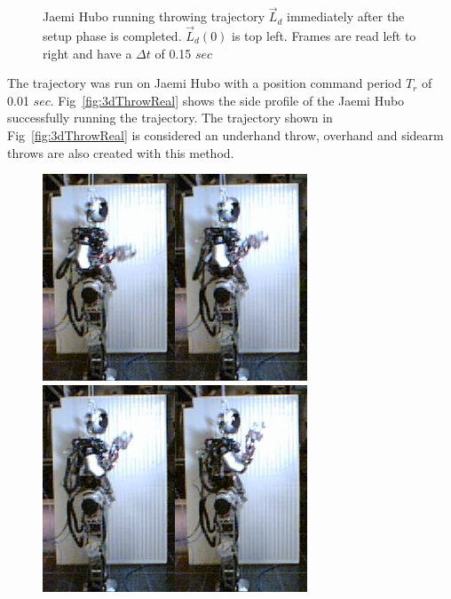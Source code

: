 \begin{figure}[thpb]
  \caption{Jaemi Hubo running throwing trajectory $\vec{L}_d$ immediately after the setup phase is completed.  $\vec{L}_d(0)$ is top left.  Frames are read left to right and have a $\Delta t$ of 0.15 $sec$}
  \label{fig:fThrow}
\end{figure}



The trajectory was run on Jaemi Hubo with a position command period $T_r$ of 0.01 $sec$.  Fig~\ref{fig:3dThrowReal} shows the side profile of the Jaemi Hubo successfully running the trajectory.  The trajectory shown in Fig~\ref{fig:3dThrowReal} is considered an underhand throw, overhand and sidearm throws are also created with this method.

\begin{figure}[thpb]
  \centering
\includegraphics[width=0.25\columnwidth]{./pictures/slowMotion/1.png}\includegraphics[width=0.25\columnwidth]{./pictures/slowMotion/2.png}\includegraphics[width=0.25\columnwidth]{./pictures/slowMotion/3.png}\includegraphics[width=0.25\columnwidth]{./pictures/slowMotion/4.png}

\end{figure}
